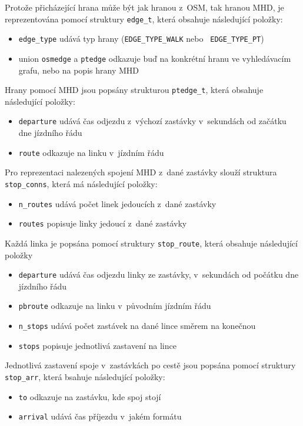 Protože přicházející hrana může být jak hranou z~OSM, tak hranou MHD, je
reprezentována pomocí struktury {\tt edge\_t}, která obsahuje následující
položky:
\begin{itemize}
	\item {\tt edge\_type} udává typ hrany ({\tt EDGE\_TYPE\_WALK} nebo {\tt
	EDGE\_TYPE\_PT})
	\item union {\tt osmedge} a {\tt ptedge} odkazuje buď na konkrétní hranu
	ve vyhledávacím grafu, nebo na popis hrany MHD 
\end{itemize}
Hrany pomocí MHD jsou popsány strukturou {\tt ptedge\_t}, která obsahuje
následující položky: 
\begin{itemize}
	\item {\tt departure} udává čas odjezdu z~výchozí zastávky v~sekundách
	od začátku dne jízdního řádu
	\item {\tt route} odkazuje na linku v~jízdním řádu
\end{itemize}

Pro reprezentaci nalezených spojení MHD z~dané zastávky slouží struktura {\tt
stop\_conns}, která má následující položky:
\begin{itemize}
	\item {\tt n\_routes} udává počet linek jedoucích z~dané zastávky
	\item {\tt routes} popisuje linky jedoucí z~dané zastávky
\end{itemize}
Každá linka je popsána pomocí struktury {\tt stop\_route}, která obsahuje
následující položky 
\begin{itemize}
	\item {\tt departure} udává čas odjezdu linky ze zastávky, v~sekundách
	od počátku dne jízdního řádu 
	\item {\tt pbroute} odkazuje na linku v~původním jízdním řádu
	\item {\tt n\_stops} udává počet zastávek na dané lince směrem na
	konečnou
	\item {\tt stops} popisuje jednotlivá zastavení na lince
\end{itemize}
Jednotlivá zastavení spoje v~zastávkách po cestě jsou popsána pomocí struktury
{\tt stop\_arr}, která bsahuje následující položky:
\begin{itemize}
	\item {\tt to} odkazuje na zastávku, kde spoj stojí
	\item {\tt arrival} udává čas příjezdu \TODO v~jakém formátu
\end{itemize}
 
